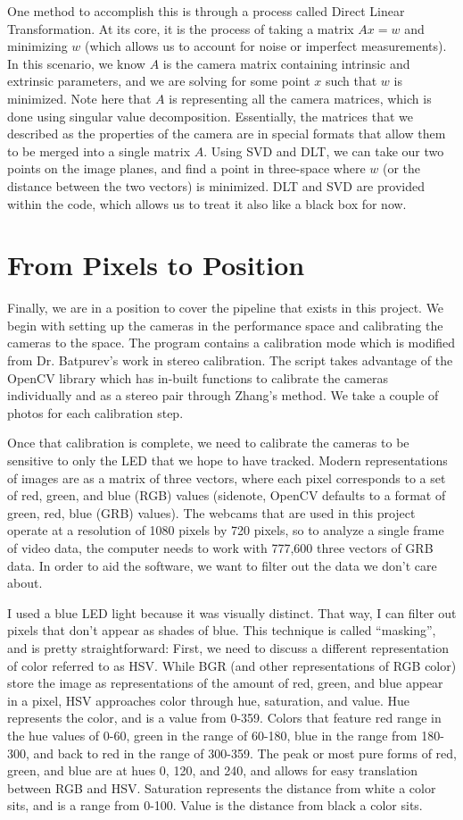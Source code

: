 \documentclass[12pt,twoside]{reedthesis}
\begin{document}
	One method to accomplish this is through a process called Direct Linear Transformation. At its core, it is the process of taking a matrix $Ax = w$ and minimizing $w$ (which allows us to account for noise or imperfect measurements). In this scenario, we know $A$ is the camera matrix containing intrinsic and extrinsic parameters, and we are solving for some point $x$ such that $w$ is minimized. Note here that $A$ is representing all the camera matrices, which is done using singular value decomposition. Essentially, the matrices that we described as the properties of the camera are in special formats that allow them to be merged into a single matrix $A$. Using SVD and DLT, we can take our two points on the image planes, and find a point in three-space where $w$ (or the distance between the two vectors) is minimized. DLT and SVD are provided within the code, which allows us to treat it also like a black box for now.

\section{From Pixels to Position}
Finally, we are in a position to cover the pipeline that exists in this project. We begin with setting up the cameras in the performance space and calibrating the cameras to the space. The program contains a calibration mode which is modified from Dr. Batpurev's work in stereo calibration. The script takes advantage of the OpenCV library which has in-built functions to calibrate the cameras individually and as a stereo pair through Zhang's method. We take a couple of photos for each calibration step.

Once that calibration is complete, we need to calibrate the cameras to be sensitive to only the LED that we hope to have tracked. Modern representations of images are as a matrix of three vectors, where each pixel corresponds to a set of red, green, and blue (RGB) values (sidenote, OpenCV defaults to a format of green, red, blue (GRB) values). The webcams that are used in this project operate at a resolution of 1080 pixels by 720 pixels, so to analyze a single frame of video data, the computer needs to work with 777,600 three vectors of GRB data. In order to aid the software, we want to filter out the data we don't care about.

I used a blue LED light because it was visually distinct. That way, I can filter out pixels that don't appear as shades of blue. This technique is called “masking”, and is pretty straightforward: First, we need to discuss a different representation of color referred to as HSV. While BGR (and other representations of RGB color) store the image as representations of the amount of red, green, and blue appear in a pixel, HSV approaches color through hue, saturation, and value. Hue represents the color, and is a value from 0-359. Colors that feature red range in the hue values of 0-60, green in the range of 60-180, blue in the range from 180-300, and back to red in the range of 300-359. The peak or most pure forms of red, green, and blue are at hues 0, 120, and 240, and allows for easy translation between RGB and HSV. Saturation represents the distance from white a color sits, and is a range from 0-100. Value is the distance from black a color sits.
\end{document}
